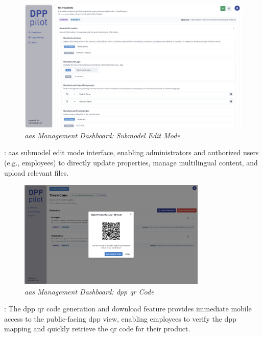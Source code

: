 \begin{figure}[H]
  \centering
  \includegraphics[width=\textwidth]{figures/pilot_interface_6.png}
  \caption{%
    \textit{\ac{aas} Management Dashboard: Submodel Edit Mode} 
  }
  \label{fig:pilot_interface_6}
\end{figure}

: \ac{aas} submodel edit mode interface, enabling administrators and authorized users (e.g., employees) to directly update properties, manage multilingual content, and upload relevant files.

\begin{figure}[H]
  \centering
  \includegraphics[width=0.8\textwidth]{figures/pilot_interface_4.png}
  \caption{%
    \textit{\ac{aas} Management Dashboard: \ac{dpp} \ac{qr} Code} 
  }
  \label{fig:pilot_interface_4}
\end{figure}

: The \ac{dpp} \ac{qr} code generation and download feature provides immediate mobile access to the public-facing \ac{dpp} view, enabling employees to verify the \ac{dpp} mapping and quickly retrieve the \ac{qr} code for their product.


